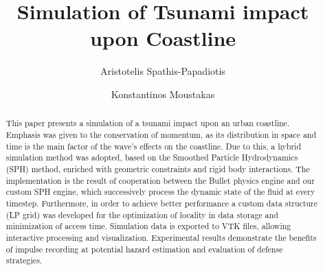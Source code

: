 \documentclass{llncs}
\begin{document}
\title{Simulation of Tsunami impact upon Coastline}


\author{Aristotelis Spathis-Papadiotis \and Konstantinos Moustakas}



\maketitle

\begin{abstract}
  This paper presents a simulation of a tsunami impact upon an urban coastline. Emphasis
  was given to the conservation of momentum, as its distribution in space and time is the
  main factor of the wave's effects on the coastline. Due to this, a hybrid simulation
  method was adopted, based on the Smoothed Particle Hydrodynamics (SPH) method, enriched
  with geometric constraints and rigid body interactions. The implementation is the result
  of cooperation between the Bullet physics engine and our custom SPH engine, which
  successively process the dynamic state of the fluid at every timestep. Furthermore, in
  order to achieve better performance a custom data structure (LP grid) was developed for
  the optimization of locality in data storage and minimization of access time. Simulation
  data is exported to VTK files, allowing interactive processing and
  visualization. Experimental results demonstrate the benefits of impulse recording at
  potential hazard estimation and evaluation of defense strategies. 
\end{abstract}
\end{document}
